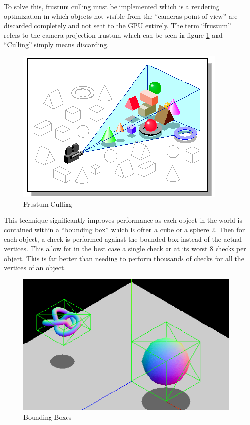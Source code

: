 \documentclass[11pt]{article}
\begin{document}
To solve this, frustum culling must be implemented which is a rendering
optimization in which objects not visible from the ``cameras point of view'' are
discarded completely and not sent to the GPU entirely. The term ``frustum'' refers
to the camera projection frustum which can be seen in figure
\ref{fig:frustum_culling} and ``Culling'' simply means discarding.

\begin{figure}[h!]
  \centering
  \includegraphics[width=\textwidth]{images/frustum_culling.png}
  \caption{Frustum Culling \cite{frustum_culling}}
  \label{fig:frustum_culling}
\end{figure}


This technique significantly improves performance as each object in the world is
contained within a ``bounding box'' which is often a cube or a sphere
\ref{fig:bounding_boxes}. Then for each object, a check is performed against the
bounded box instead of the actual vertices. This allow for in the best case a
single check or at its worst 8 checks per object. This is far better than
needing to perform thousands of checks for all the vertices of an object.

\begin{figure}[h!]
  \centering
  \includegraphics[width=\textwidth]{images/bounding_boxes.png}
  \caption{Bounding Boxes \cite{bounding_boxes}}
  \label{fig:bounding_boxes}
\end{figure}
\end{document}
